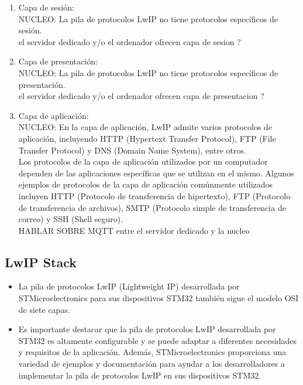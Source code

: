 \begin{enumerate}
  \item Capa de sesión: 
    \\
 NUCLEO:   La pila de protocolos LwIP no tiene protocolos específicos de sesión.
    \\
    el servidor dedicado y/o el ordenador ofrecen capa de sesion ?


  \item Capa de presentación: 
    \\
 NUCLEO:   La pila de protocolos LwIP no tiene protocolos específicos de presentación.
    \\
    el servidor dedicado y/o el ordenador ofrecen capa de presentacion ?


  \item Capa de aplicación: 
    \\
 NUCLEO:   En la capa de aplicación, LwIP admite varios protocolos de aplicación, incluyendo HTTP (Hypertext Transfer Protocol), FTP (File Transfer Protocol) y DNS (Domain Name System), entre otros.
    \\
    Los protocolos de la capa de aplicación utilizados por un computador dependen de las aplicaciones específicas que se utilizan en el mismo. Algunos ejemplos de protocolos de la capa de aplicación comúnmente utilizados incluyen HTTP (Protocolo de transferencia de hipertexto), FTP (Protocolo de transferencia de archivos), SMTP (Protocolo simple de transferencia de correo) y SSH (Shell seguro).
    \\
    HABLAR SOBRE MQTT entre el servidor dedicado y la nucleo 

\end{enumerate}


\subsection{LwIP Stack}

\begin{itemize}

  \item La pila de protocolos LwIP (Lightweight IP) desarrollada por STMicroelectronics para sus dispositivos STM32 también sigue el modelo OSI de siete capas.

  \item Es importante destacar que la pila de protocolos LwIP desarrollada por STM32 es altamente configurable y se puede adaptar a diferentes necesidades y requisitos de la aplicación. Además, STMicroelectronics proporciona una variedad de ejemplos y documentación para ayudar a los desarrolladores a implementar la pila de protocolos LwIP en sus dispositivos STM32.

\end{itemize}


